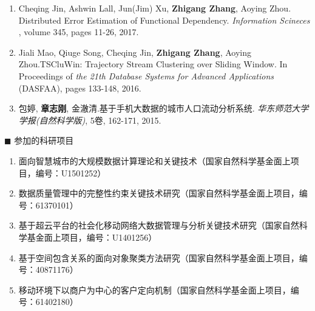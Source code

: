 \begin{enumerate}
	\item  Cheqing Jin, Ashwin Lall, Jun(Jim) Xu, \textbf{Zhigang Zhang},  Aoying Zhou. Distributed Error Estimation of Functional Dependency. \textit{Information Scineces} , volume 345, pages 11-26, 2017.
	
	\item  Jiali Mao, Qiuge Song, Cheqing Jin, \textbf{Zhigang Zhang},  Aoying Zhou.TSCluWin: Trajectory Stream Clustering over Sliding Window. In Proceedings of \textit{the 21th Database Systems for Advanced Applications} (DASFAA), pages 133-148, 2016.
	
	\item 包婷, \textbf{章志刚}, 金澈清.基于手机大数据的城市人口流动分析系统.  \textit{华东师范大学学报(自然科学版)}, 5卷, 162-171, 2015.

\end{enumerate}

{\heiti $\blacksquare$ 参加的科研项目}
\begin{enumerate}
	\renewcommand{\labelenumi}{[\theenumi]}
	\renewcommand\baselinestretch{1}\selectfont 	
	
	
	
	\item 面向智慧城市的大规模数据计算理论和关键技术（国家自然科学基金面上项目，编号：U1501252）
	
	\item 数据质量管理中的完整性约束关键技术研究（国家自然科学基金面上项目，编号：61370101）
	
	\item 基于超云平台的社会化移动网络大数据管理与分析关键技术研究（国家自然科学基金面上项目，编号：U1401256）
	
	\item 基于空间包含关系的面向对象聚类方法研究（国家自然科学基金面上项目，编号：40871176）
		
	\item 移动环境下以商户为中心的客户定向机制（国家自然科学基金面上项目，编号：61402180）

\end{enumerate}
